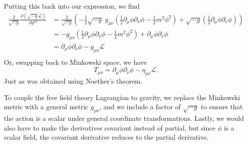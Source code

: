 \documentclass[12pt]{article}
\newcommand{\delmu}{\partial_{\mu}}
\newcommand{\delnu}{\partial_{\nu}}
\begin{document}
Putting this back into our expression, we find
\begin{align*}
    \frac{2}{\sqrt{-g}}\frac{\partial(\sqrt{-g}\mathcal{L})}{\partial g^{\mu\nu}}
    &= \frac{2}{\sqrt{-g}} \left( -\frac{1}{2}\sqrt{-g} \;
    g_{\mu\nu}\left(\frac{1}{2}\delmu\phi\delnu\phi - \frac{1}{2}m^2\phi^2\right)+
    \sqrt{-g}\left(\frac{1}{2}\delmu\phi\delnu\phi \right)\right)\\
    &= -g_{\mu\nu}\left(\frac{1}{2}\delmu\phi\delnu\phi - \frac{1}{2}m^2\phi^2\right) + \delmu\phi\delnu\phi \\
    &= \delmu\phi\delnu\phi - g_{\mu\nu}\mathcal{L}\\
\end{align*}
Or, swapping back to Minkowski space, we have
\begin{equation*}
    \boxed{T_{\mu\nu} = \delmu\phi\delnu\phi - \eta_{\mu\nu}\mathcal{L}.}
\end{equation*}
Just as was obtained using Noether's theorem.

To couple the free field theory Lagrangian to gravity, we replace the Minkowski
metric with a general metric $g_{\mu\nu}$, and we include a factor of
$\sqrt{-g}$ to ensure that the action is a scalar under general coordinate
transformations. Lastly, we would also have to make the derivatives covariant
instead of partial, but since $\phi$ is a scalar field, the covariant derivative
reduces to the partial derivative.
\end{document}
